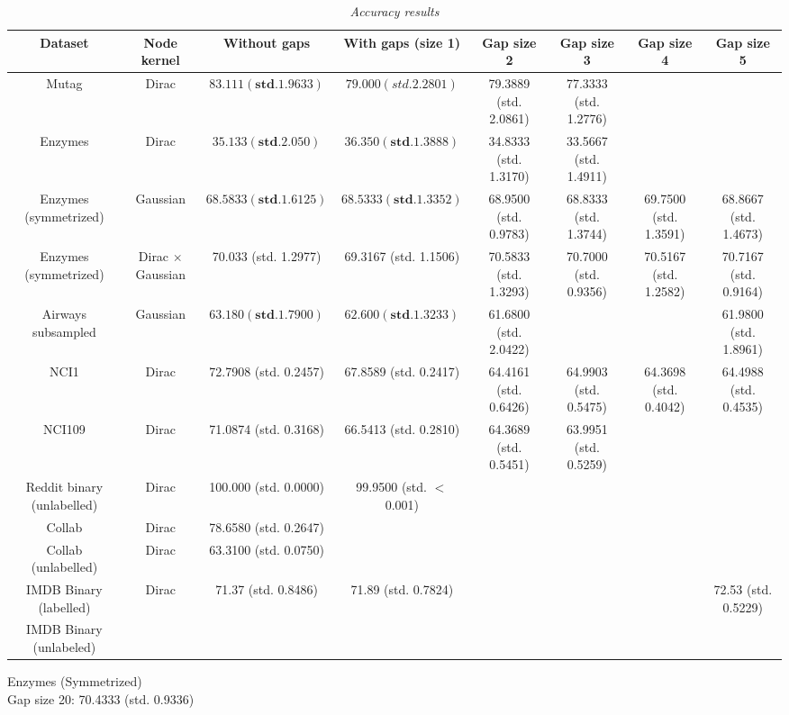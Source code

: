 \documentclass{article}
\begin{document}
\begin{table}[H]
	\centering
	\hspace*{-0.7in}
	\scalebox{0.6} {
		\begin{tabular}{c|c|c|c|c|c|c|c}
		Dataset & Node kernel & Without gaps & With gaps (size 1) & Gap size 2 & Gap size 3 & Gap size 4 & Gap size 5\\
		\hline
		Mutag & Dirac & $\mathbf{83.111 (std. 1.9633)}$ & $79.000 (std. 2.2801)$ & 79.3889 (std. 2.0861) & 77.3333 (std. 1.2776) & & \\
		Enzymes & Dirac & $\mathbf{35.133 (std. 2.050)}$ & $\mathbf{36.350 (std. 1.3888)}$ & 34.8333 (std. 1.3170) & 33.5667 (std. 1.4911) & & \\
		Enzymes (symmetrized) & Gaussian & $\mathbf{68.5833 (std. 1.6125)}$ & $\mathbf{68.5333 (std. 1.3352)}$ & 68.9500 (std. 0.9783) & 68.8333 (std. 1.3744) & 69.7500 (std. 1.3591) & 68.8667 (std. 1.4673) \\
		Enzymes (symmetrized) & Dirac $\times$ Gaussian & 70.033 (std. 1.2977) & 69.3167 (std. 1.1506) & 70.5833 (std. 1.3293) & 70.7000 (std. 0.9356) & 70.5167 (std. 1.2582) & 70.7167 (std. 0.9164)\\
		Airways subsampled & Gaussian & $\mathbf{63.180 (std. 1.7900)}$ & $\mathbf{62.600 (std. 1.3233)}$ & 61.6800 (std. 2.0422) & & & 61.9800 (std. 1.8961) \\
		NCI1 & Dirac & 72.7908 (std. 0.2457) & 67.8589 (std. 0.2417) & 64.4161 (std. 0.6426) & 64.9903 (std. 0.5475) & 64.3698 (std. 0.4042) & 64.4988 (std. 0.4535) \\
		NCI109 & Dirac & 71.0874 (std. 0.3168) & 66.5413 (std. 0.2810) & 64.3689 (std. 0.5451) & 63.9951 (std. 0.5259) & & \\
		Reddit binary (unlabelled) & Dirac & 100.000 (std. 0.0000) & 99.9500 (std. $<$ 0.001) & & & &  \\
Collab & Dirac & 78.6580 (std. 0.2647) & & & & & \\
Collab (unlabelled) & Dirac & 63.3100 (std. 0.0750) & & & & &  \\
		IMDB Binary (labelled) & Dirac & 71.37 (std. 0.8486) & 71.89 (std. 0.7824) & & & & 72.53 (std. 0.5229) \\
		IMDB Binary (unlabeled) & 
		\end{tabular}
	}
	\caption{\textit{Accuracy results}}
	\label{table:raccuracy_results}
\end{table}
Enzymes (Symmetrized) \\

Gap size 20: 70.4333 (std. 0.9336) \\

\end{document}
